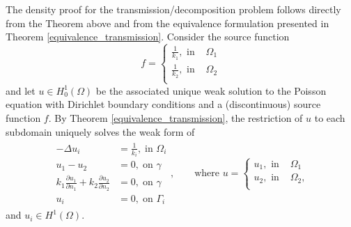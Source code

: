 The density proof for the transmission/decomposition problem follows directly from the Theorem above and from the equivalence formulation presented in Theorem \ref{equivalence_transmission}. Consider the source function
\begin{equation}
    f = \begin{cases}
        \frac{1}{k_1}, \text{ in } & \Omega_1\\
        \frac{1}{k_2}, \text{ in } & \Omega_2\\
    \end{cases}
\end{equation}
and let \(u \in H^1_0(\Omega)\) be the associated unique weak solution to the Poisson equation with Dirichlet boundary conditions and a (discontinuous) source function \(f\). By Theorem \ref{equivalence_transmission}, the restriction of \(u\) to each subdomain uniquely solves the weak form of
\begin{align}\label{transmission_restriction_equations_density}
    \begin{split}
    - \Delta u_i &= \frac{1}{k_i}, \; \text{in }\Omega_i\\
    u_1 - u_2 &= 0, \; \text{on }\gamma\\
    k_1 \frac{\partial u_1}{\partial n_1} + k_2 \frac{\partial u_2}{\partial n_2} &= 0, \; \text{on }\gamma\\
    u_i &= 0, \; \text{on }\Gamma_i
    \end{split}
    ,\qquad
    \text{where } 
    u = \begin{cases}
        u_1, \text{ in } & \Omega_1\\
        u_2, \text{ in } & \Omega_2,\\
    \end{cases}
\end{align}
and \(u_i \in H^1(\Omega)\).

